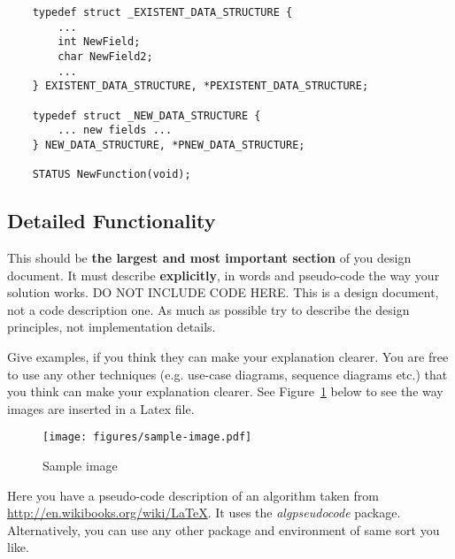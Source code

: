 \begin{lstlisting}
    typedef struct _EXISTENT_DATA_STRUCTURE {
        ...
        int NewField;
        char NewField2;
        ...
    } EXISTENT_DATA_STRUCTURE, *PEXISTENT_DATA_STRUCTURE;
    
    typedef struct _NEW_DATA_STRUCTURE {
        ... new fields ...
    } NEW_DATA_STRUCTURE, *PNEW_DATA_STRUCTURE;
    
    STATUS NewFunction(void);
\end{lstlisting}


\subsection{Detailed Functionality}

This should be \textbf{the largest and most important section} of you design document. It must describe \textbf{explicitly}, in words and pseudo-code the way your solution works. DO NOT INCLUDE CODE HERE. This is a design document, not a code description one. As much as possible try to describe the design principles, not implementation details. 

Give examples, if you think they can make your explanation clearer. You are free to use any other techniques (e.g. use-case diagrams, sequence diagrams etc.) that you think can make your explanation clearer. See Figure~\ref{fig:sample-image} below to see the way images are inserted in a Latex file. 

\begin{figure}[h]
	\centering
	\texttt{[image: figures/sample-image.pdf]}
	\caption{Sample image}
	\label{fig:sample-image}
\end{figure}


Here you have a pseudo-code description of an algorithm taken from \\ \href{http://en.wikibooks.org/wiki/LaTeX/Algorithms\_and\_Pseudocode\#Typesetting\_using\_the\_program\_package}{http://en.wikibooks.org/wiki/LaTeX}. It uses the \textit{algpseudocode} package. Alternatively, you can use any other package and environment of same sort you like. 


